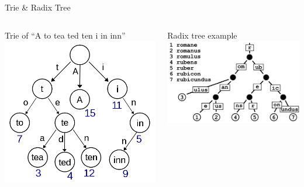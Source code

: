 \begin{frame}{Trie \& Radix Tree}
\begin{columns}
\begin{block}{Trie of ``A to tea ted ten i in inn''}
\includegraphics[width=\textwidth]{Trie_example.svg.png}
\end{block}
\begin{block}{Radix tree example}
\includegraphics[width=\textwidth]{Patricia_trie.svg.png}
\end{block}
\end{columns}
\end{frame}

